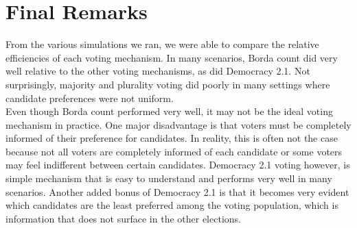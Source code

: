 \documentclass[11pt]{scrartcl}
\begin{document}
\section{Final Remarks}

From the various simulations we ran, we were able to compare the relative efficiencies of each voting mechanism. In many scenarios, Borda count did very well relative to the other voting mechanisms, as did Democracy 2.1. Not surprisingly, majority and plurality voting did poorly in many settings where candidate preferences were not uniform.\\

Even though Borda count performed very well, it may not be the ideal voting mechanism in practice. One major disadvantage is that voters must be completely informed of their preference for candidates. In reality, this is often not the case because not all voters are completely informed of each candidate or some voters may feel indifferent between certain candidates. Democracy 2.1 voting however, is simple mechanism that is easy to understand and performs very well in many scenarios. Another added bonus of Democracy 2.1 is that it becomes very evident which candidates are the least preferred among the voting population, which is information that does not surface in the other elections. 
\end{document}
